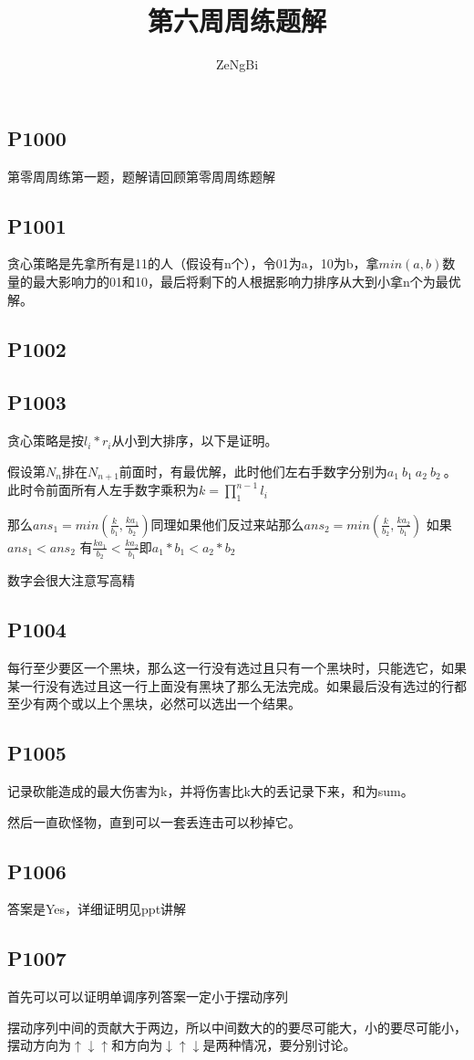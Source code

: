 \documentclass[UTF8]{ctexart}
\title{第六周周练题解}
\author{ZeNgBi}
\date{}
\begin{document}
	\maketitle
	\subsection*{P1000}
	第零周周练第一题，题解请回顾第零周周练题解
	\subsection*{P1001}
	贪心策略是先拿所有是11的人（假设有n个），令01为a，10为b，拿$min(a,b)$数量的最大影响力的01和10，最后将剩下的人根据影响力排序从大到小拿n个为最优解。
	\subsection*{P1002}
	\subsection*{P1003}
	贪心策略是按$l_i*r_i$从小到大排序，以下是证明。
	
	假设第$N_n$排在$N_{n+1}$前面时，有最优解，此时他们左右手数字分别为$a_1 \:b_1\: a_2 \:b_2\: $。此时令前面所有人左手数字乘积为$k=\prod_{1}^{n-1} l_i$
	
	那么$ans_1=min(\frac{k}{b_1},\frac{ka_1}{b_2})$同理如果他们反过来站那么$ans_2=min(\frac{k}{b_2},\frac{ka_2}{b_1})$ 如果$ans_1 < ans_2$ 有$\frac{ka_1}{b_2}<\frac{ka_2}{b_1}$即$a_1*b_1<a_2*b_2$
	
	数字会很大注意写高精
	\subsection*{P1004}
	每行至少要区一个黑块，那么这一行没有选过且只有一个黑块时，只能选它，如果某一行没有选过且这一行上面没有黑块了那么无法完成。如果最后没有选过的行都至少有两个或以上个黑块，必然可以选出一个结果。
	\subsection*{P1005}
	记录砍能造成的最大伤害为k，并将伤害比k大的丢记录下来，和为sum。
	
	然后一直砍怪物，直到可以一套丢连击可以秒掉它。
	
	\subsection*{P1006}
	答案是Yes，详细证明见ppt讲解
	
	\subsection*{P1007}
	首先可以可以证明单调序列答案一定小于摆动序列
	
	摆动序列中间的贡献大于两边，所以中间数大的的要尽可能大，小的要尽可能小，摆动方向为$\uparrow \downarrow \uparrow$和方向为$\downarrow \uparrow \downarrow$是两种情况，要分别讨论。
\end{document}
